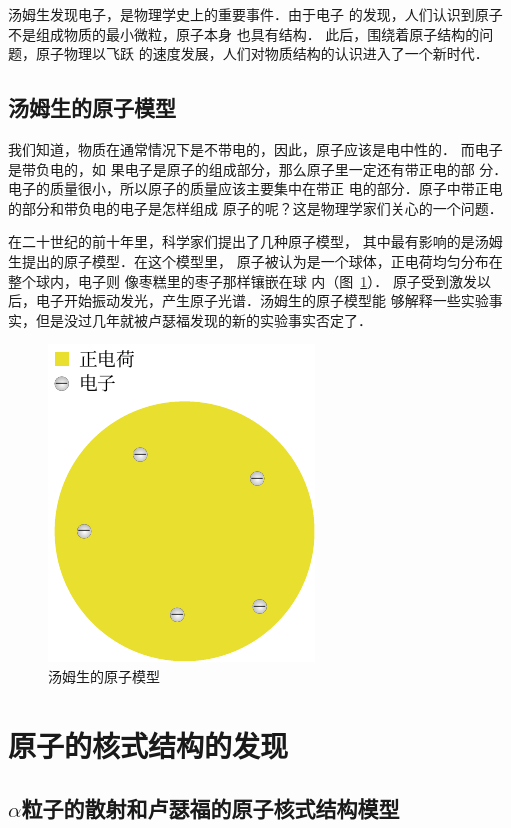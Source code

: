 汤姆生发现电子，是物理学史上的重要事件．由于电子
的发现，人们认识到原子不是组成物质的最小微粒，原子本身
也具有结构．
此后，围绕着原子结构的问题，原子物理以飞跃
的速度发展，人们对物质结构的认识进入了一个新时代．

\subsection{汤姆生的原子模型}

我们知道，物质在通常情况下是不带电的，因此，原子应该是电中性的．
而电子是带负电的，如
果电子是原子的组成部分，那么原子里一定还有带正电的部
分．电子的质量很小，所以原子的质量应该主要集中在带正
电的部分．原子中带正电的部分和带负电的电子是怎样组成
原子的呢？这是物理学家们关心的一个问题．

在二十世纪的前十年里，科学家们提出了几种原子模型，
其中最有影响的是汤姆生提出的原子模型．在这个模型里，
原子被认为是一个球体，正电荷均匀分布在整个球内，电子则
像枣糕里的枣子那样镶嵌在球
内（图~\ref{fig_C_8-1}）．
原子受到激发以后，电子开始振动发光，产生原子光谱．汤姆生的原子模型能
够解释一些实验事实，但是没过几年就被卢瑟福发现的新的实验事实否定了．
\begin{figure}[htbp]
    \centering
    \includegraphics{fig/C/8-1.pdf}
    \caption{汤姆生的原子模型}\label{fig_C_8-1}
\end{figure}

\section{原子的核式结构的发现}
\subsection{$\alpha$粒子的散射和卢瑟福的原子核式结构模型} 

